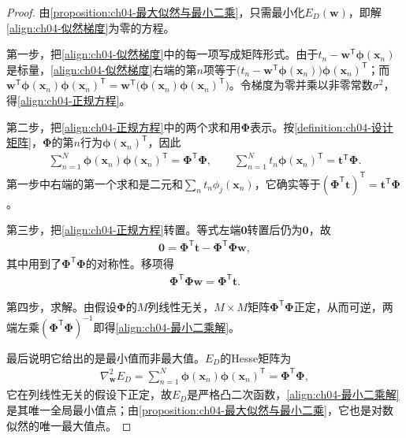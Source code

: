 \documentclass[../../main.tex]{subfiles}
\begin{document}
\begin{proof}
由\cref{proposition:ch04-最大似然与最小二乘}，只需最小化$E_D(\boldsymbol{w})$，即解\eqref{align:ch04-似然梯度}为零的方程。

第一步，把\eqref{align:ch04-似然梯度}中的每一项写成矩阵形式。由于$t_n-\boldsymbol{w}^{\mathsf{T}}\boldsymbol{\phi}(\boldsymbol{x}_n)$是标量，\eqref{align:ch04-似然梯度}右端的第$n$项等于$\bigl(t_n-\boldsymbol{w}^{\mathsf{T}}\boldsymbol{\phi}(\boldsymbol{x}_n)\bigr)\boldsymbol{\phi}(\boldsymbol{x}_n)^{\mathsf{T}}$；而$\boldsymbol{w}^{\mathsf{T}}\boldsymbol{\phi}(\boldsymbol{x}_n)\boldsymbol{\phi}(\boldsymbol{x}_n)^{\mathsf{T}}=\boldsymbol{w}^{\mathsf{T}}\bigl(\boldsymbol{\phi}(\boldsymbol{x}_n)\boldsymbol{\phi}(\boldsymbol{x}_n)^{\mathsf{T}}\bigr)$。令梯度为零并乘以非零常数$\sigma^2$，得\eqref{align:ch04-正规方程}。

第二步，把\eqref{align:ch04-正规方程}中的两个求和用$\boldsymbol{\Phi}$表示。按\cref{definition:ch04-设计矩阵}，$\boldsymbol{\Phi}$的第$n$行为$\boldsymbol{\phi}(\boldsymbol{x}_n)^{\mathsf{T}}$，因此
\begin{align*}
  \sum_{n=1}^{N}\boldsymbol{\phi}(\boldsymbol{x}_n)\boldsymbol{\phi}(\boldsymbol{x}_n)^{\mathsf{T}}=\boldsymbol{\Phi}^{\mathsf{T}}\boldsymbol{\Phi},\qquad
  \sum_{n=1}^{N}t_n\boldsymbol{\phi}(\boldsymbol{x}_n)^{\mathsf{T}}=\boldsymbol{t}^{\mathsf{T}}\boldsymbol{\Phi}.
\end{align*}
第一步中右端的第一个求和是二元和$\sum_n t_n\phi_j(\boldsymbol{x}_n)$，它确实等于$(\boldsymbol{\Phi}^{\mathsf{T}}\boldsymbol{t})^{\mathsf{T}}=\boldsymbol{t}^{\mathsf{T}}\boldsymbol{\Phi}$。

第三步，把\eqref{align:ch04-正规方程}转置。等式左端$\boldsymbol{0}$转置后仍为$\boldsymbol{0}$，故
\begin{align*}
  \boldsymbol{0}=\boldsymbol{\Phi}^{\mathsf{T}}\boldsymbol{t}-\boldsymbol{\Phi}^{\mathsf{T}}\boldsymbol{\Phi}\boldsymbol{w},
\end{align*}
其中用到了$\boldsymbol{\Phi}^{\mathsf{T}}\boldsymbol{\Phi}$的对称性。移项得
\begin{align*}
  \boldsymbol{\Phi}^{\mathsf{T}}\boldsymbol{\Phi}\boldsymbol{w}=\boldsymbol{\Phi}^{\mathsf{T}}\boldsymbol{t}.
\end{align*}

第四步，求解。由假设$\boldsymbol{\Phi}$的$M$列线性无关，$M\times M$矩阵$\boldsymbol{\Phi}^{\mathsf{T}}\boldsymbol{\Phi}$正定，从而可逆，两端左乘$(\boldsymbol{\Phi}^{\mathsf{T}}\boldsymbol{\Phi})^{-1}$即得\eqref{align:ch04-最小二乘解}。

最后说明它给出的是最小值而非最大值。$E_D$的Hesse矩阵为
\begin{align*}
  \nabla_{\boldsymbol{w}}^2E_D=\sum_{n=1}^{N}\boldsymbol{\phi}(\boldsymbol{x}_n)\boldsymbol{\phi}(\boldsymbol{x}_n)^{\mathsf{T}}=\boldsymbol{\Phi}^{\mathsf{T}}\boldsymbol{\Phi},
\end{align*}
它在列线性无关的假设下正定，故$E_D$是严格凸二次函数，\eqref{align:ch04-最小二乘解}是其唯一全局最小值点；由\cref{proposition:ch04-最大似然与最小二乘}，它也是对数似然的唯一最大值点。
\end{proof}
\end{document}
